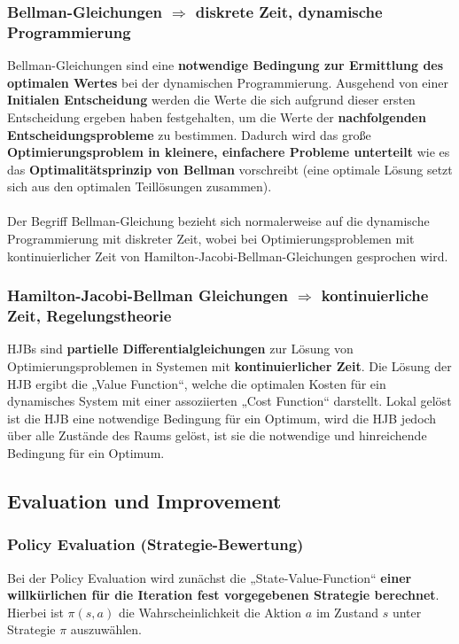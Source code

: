 \documentclass[10pt]{scrartcl}
\begin{document}
\subsubsection{Bellman-Gleichungen $\Rightarrow$ diskrete Zeit, dynamische Programmierung}
Bellman-Gleichungen sind eine \textbf{notwendige Bedingung zur Ermittlung des optimalen Wertes}  bei der dynamischen Programmierung. Ausgehend von einer \textbf{Initialen Entscheidung} werden die Werte die sich aufgrund dieser ersten Entscheidung ergeben haben festgehalten, um die Werte der \textbf{nachfolgenden Entscheidungsprobleme} zu bestimmen. Dadurch wird das große \textbf{Optimierungsproblem in kleinere, einfachere Probleme unterteilt} wie es das \textbf{Optimalitätsprinzip von Bellman} vorschreibt (eine optimale Lösung setzt sich aus den optimalen Teillösungen zusammen).\\
\\
Der Begriff Bellman-Gleichung bezieht sich normalerweise auf die dynamische Programmierung mit diskreter Zeit, wobei bei Optimierungsproblemen mit kontinuierlicher Zeit von Hamilton-Jacobi-Bellman-Gleichungen gesprochen wird.


\subsubsection{Hamilton-Jacobi-Bellman Gleichungen $\Rightarrow$ kontinuierliche  Zeit, Regelungstheorie}
HJBs sind \textbf{partielle Differentialgleichungen} zur Lösung von Optimierungsproblemen in Systemen mit \textbf{kontinuierlicher Zeit}. Die Lösung der HJB ergibt die „Value Function“, welche die optimalen Kosten für ein dynamisches System mit einer assoziierten „Cost Function“ darstellt. Lokal gelöst ist die HJB eine notwendige Bedingung für ein Optimum, wird die HJB jedoch über alle Zustände des Raums gelöst, ist sie die notwendige und hinreichende Bedingung für ein Optimum.

\subsection{Evaluation und Improvement}
\subsubsection{Policy Evaluation (Strategie-Bewertung)}
Bei der Policy Evaluation wird zunächst die „State-Value-Function“  \textbf{einer willkürlichen für die Iteration fest vorgegebenen Strategie berechnet}. Hierbei ist $\pi(s,a)$ die Wahrscheinlichkeit die Aktion $a$ im Zustand $s$ unter Strategie $\pi$ auszuwählen.
\end{document}
